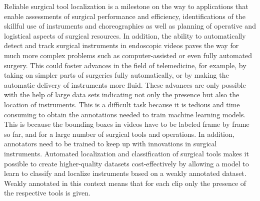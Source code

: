 Reliable surgical tool localization is a milestone on the way to applications that enable assessments of surgical performance and efficiency, identifications of the skillful use of instruments and choreographies as well as planning of operative and logistical aspects of surgical resources. In addition, the ability to automatically detect and track surgical instruments in endoscopic videos paves the way for much more complex problems such as computer-assisted or even fully automated surgery. This could foster advances in the field of telemedicine, for example, by taking on simpler parts of surgeries fully automatically, or by making the automatic delivery of instruments more fluid. These advances are only possible with the help of large data sets indicating not only the presence but also the location of instruments. This is a difficult task because it is tedious and time consuming to obtain the annotations needed to train machine learning models. This is because the bounding boxes in videos have to be labeled frame by frame so far, and for a large number of surgical tools and operations. In addition, annotators need to be trained to keep up with innovations in surgical instruments. Automated localization and classification of surgical tools makes it possible to create higher-quality datasets cost-effectively by allowing a model to learn to classify and localize instruments based on a weakly annotated dataset. Weakly annotated in this context means that for each clip only the presence of the respective tools is given.